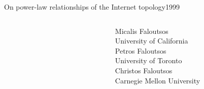 \documentclass[ngerman,compress,hyperref={bookmarks}]{beamer}
\begin{document}
\begin{frame}{On power-law relationships of the Internet topology}{1999}
\begin{columns}[c]
\begin{column}{0.1\textwidth}
\begin{figure}
        \label{faloutsos}
      \end{figure}
    \end{column}
    \begin{column}{0.3\textwidth}
      {\scriptsize Micalis Faloutsos\\
      \vspace{0.1cm}
      University of California\\
      \vspace{0.8cm}
      Petros Faloutsos\\
      \vspace{0.1cm}
      University of Toronto\\
      \vspace{0.7cm}
      Christos Faloutsos\\
      \vspace{0.1cm}
      Carnegie Mellon University}
    \end{column}
  \end{columns}
\end{frame}
\end{document}
